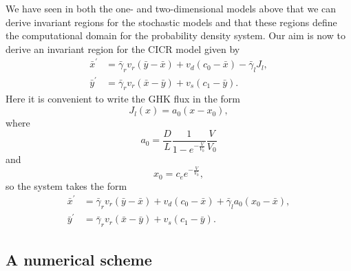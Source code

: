 We have seen in both the one- and two-dimensional models above that we can derive invariant
regions for the stochastic models and that these regions define the
computational domain for the probability density system. Our aim is now to
derive an invariant region for the CICR model given by
\begin{align}
\bar{x}^{\prime}  &  =\bar{\gamma}_{r}v_{r}\left(  \bar{y}-\bar{x}\right)
+v_{d}\left(  c_{0}-\bar{x}\right)  -\bar{\gamma}_{l}J_{l},\label{c1v2}\\
\bar{y}^{\prime}  &  =\bar{\gamma}_{r}v_{r}\left(  \bar{x}-\bar{y}\right)
+v_{s}\left(  c_{1}-\bar{y}\right)  . \label{c2v2}
\end{align}
Here it is convenient to write the GHK flux in the form
\[
J_{l}(x)=a_{0}(x-x_{0}),
\]
where
\[
a_{0}=\frac{D}{L}\frac{1}{1-e^{-\frac{V}{V_{0}}}}\frac{V}{V_{0}}
\]
and
\[
x_{0}=c_{e}e^{-\frac{V}{V_{0}}},
\]
so the system takes the form
\begin{align}
\bar{x}^{\prime}  &  =\bar{\gamma}_{r}v_{r}\left(  \bar{y}-\bar{x}\right)
+v_{d}\left(  c_{0}-\bar{x}\right)  +\bar{\gamma}_{l}a_{0}(x_{0}-\bar
{x}),\label{xc1v2}\\
\bar{y}^{\prime}  &  =\bar{\gamma}_{r}v_{r}\left(  \bar{x}-\bar{y}\right)
+v_{s}\left(  c_{1}-\bar{y}\right)  . \label{yc2v2}
\end{align}


\subsection{A numerical scheme}

